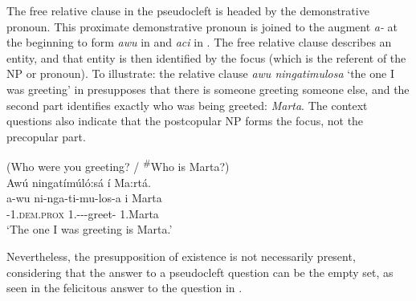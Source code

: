\documentclass[output=paper]{langscibook}
\begin{document}
The free relative clause in the pseudocleft is headed by the demonstrative pronoun. This proximate demonstrative pronoun is joined to the augment \textit{a\nobreakdash-} at the beginning to form \textit{awu} in  and \textit{aci} in . The free relative clause describes an entity, and that entity is then identified by the focus (which is the referent of the NP or pronoun). To illustrate: the relative clause \textit{awu ningatimulosa} ‘the one I was greeting’ in  presupposes that there is someone greeting someone else, and the second part identifies exactly who was being greeted: \textit{Marta}. The context questions also indicate that the postcopular NP forms the focus, not the precopular part.\largerpage

\ea
\label{bkm:Ref120695361}
\label{bkm:Ref141365224}(Who were you greeting? / \textsuperscript{\#}Who is Marta?)\\
Awú ningatímúló:sá í Ma:rtá.\\
\gll
a-wu  ni-nga-ti-mu-los-a  i  Marta\\
\AUG{}-1\textsc{.dem.prox}  1\SG.\SM{}-\REL{}-\IPFV{}-greet-\FV{}  \COP{}  1.Marta\\
\glt
‘The one I was greeting is Marta.’\\

\z

Nevertheless, the presupposition of existence is not necessarily present, considering that the answer to a pseudocleft question can be the empty set, as seen in the felicitous answer to the question in .
\end{document}
